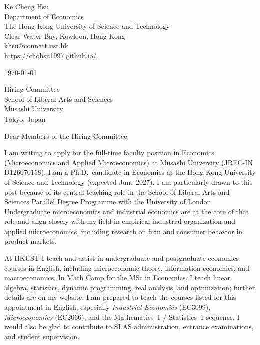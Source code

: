 \documentclass[11pt]{article}
\begin{document}
\begin{flushleft}
Ke Cheng Hsu \\
Department of Economics \\
The Hong Kong University of Science and Technology \\
Clear Water Bay, Kowloon, Hong Kong \\
\href{mailto:khsu@connect.ust.hk}{khsu@connect.ust.hk} \\
\href{https://cliohsu1997.github.io/}{https://cliohsu1997.github.io/}
\end{flushleft}

\vspace{0.2em}
\today

\vspace{0.5em}
Hiring Committee \\
School of Liberal Arts and Sciences \\
Musashi University \\
Tokyo, Japan

\vspace{0.5em}
Dear Members of the Hiring Committee,

I am writing to apply for the full-time faculty position in Economics (Microeconomics and Applied Microeconomics) at Musashi University (JREC-IN D126070158). I am a Ph.D.\ candidate in Economics at the Hong Kong University of Science and Technology (expected June 2027). I am particularly drawn to this post because of its central teaching role in the School of Liberal Arts and Sciences Parallel Degree Programme with the University of London. Undergraduate microeconomics and industrial economics are at the core of that role and align closely with my field in empirical industrial organization and applied microeconomics, including research on firm and consumer behavior in product markets.

At HKUST I teach and assist in undergraduate and postgraduate economics courses in English, including microeconomic theory, information economics, and macroeconomics. In Math Camp for the MSc in Economics, I teach linear algebra, statistics, dynamic programming, real analysis, and optimization; further details are on my website. I am prepared to teach the courses listed for this appointment in English, especially \emph{Industrial Economics} (EC3099), \emph{Microeconomics} (EC2066), and the Mathematics~1 / Statistics~1 sequence. I would also be glad to contribute to SLAS administration, entrance examinations, and student supervision.
\end{document}
